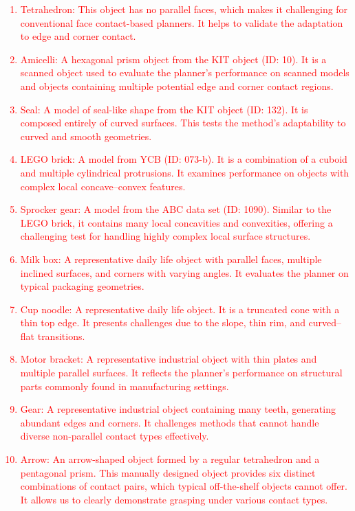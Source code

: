 \documentclass[onecolumn]{IEEEtran}
\newcommand{\rev}[1]{\textcolor{red}{#1}}
\begin{document}
\rev{\begin{enumerate}
    \item Tetrahedron: This object has no parallel faces, which makes it challenging for conventional face contact-based planners. It helps to validate the adaptation to edge and corner contact.
    \item Amicelli: A hexagonal prism object from the KIT object (ID: 10). It is a scanned object used to evaluate the planner’s performance on scanned models and objects containing multiple potential edge and corner contact regions.
    \item Seal: A model of seal-like shape from the KIT object (ID: 132). It is composed entirely of curved surfaces. This tests the method’s adaptability to curved and smooth geometries.
    \item LEGO brick: A model from YCB (ID: 073-b). It is a combination of a cuboid and multiple cylindrical protrusions. It examines performance on objects with complex local concave–convex features.
    \item Sprocker gear: A model from the ABC data set (ID: 1090). Similar to the LEGO brick, it contains many local concavities and convexities, offering a challenging test for handling highly complex local surface structures.
    \item Milk box: A representative daily life object with parallel faces, multiple inclined surfaces, and corners with varying angles. It evaluates the planner on typical packaging geometries.
    \item Cup noodle: A representative daily life object. It is a truncated cone with a thin top edge. It presents challenges due to the slope, thin rim, and curved–flat transitions.
    \item Motor bracket: A representative industrial object with thin plates and multiple parallel surfaces. It reflects the planner’s performance on structural parts commonly found in manufacturing settings.
    \item Gear: A representative industrial object containing many teeth, generating abundant edges and corners. It challenges methods that cannot handle diverse non-parallel contact types effectively.
    \item Arrow: An arrow-shaped object formed by a regular tetrahedron and a pentagonal prism. This manually designed object provides six distinct combinations of contact pairs, which typical off-the-shelf objects cannot offer. It allows us to clearly demonstrate grasping under various contact types.
\end{enumerate}}
\end{document}

